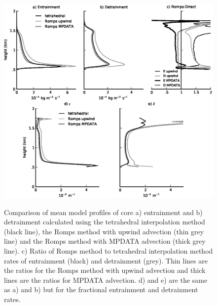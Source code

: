 \documentclass[12pt]{article}
\begin{document}
\begin{figure}[t]
  \noindent
  \includegraphics[width=40pc,angle=0]{./figures/direct_vs_romps}\\
  \caption{Comparison of mean model profiles of core a) entrainment and b) 
  detrainment calculated using the tetrahedral interpolation method (black 
  line), the Romps method with upwind advection (thin grey line) and the Romps 
  method with MPDATA advection (thick grey line).  c) Ratio of Romps method to 
  tetrahedral interpolation method rates of entrainment (black) and detrainment 
  (grey).  Thin lines are the ratios for the Romps method with upwind advection
  and thick lines are the ratios for MPDATA advection.  d) and e) are the same 
  as a) and b) but for the fractional entrainment and detrainment rates.}
  \label{fig:direct_vs_romps}
\end{figure}
\end{document}
